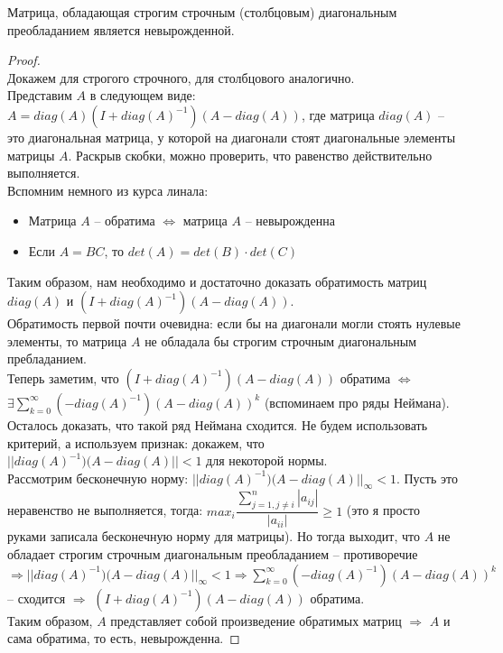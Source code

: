 \begin{theorem*}
    Матрица, обладающая строгим строчным (столбцовым) диагональным
    преобладанием является невырожденной.
\end{theorem*}
\begin{proof} \ \\
    \indent Докажем для строгого строчного, для столбцового аналогично. \\

    \indent Представим $A$ в следующем виде: $A = diag(A)(I + diag(A)^{-1})(A - diag(A))$,
    где матрица $diag(A)$ -- это диагональная матрица, у которой на диагонали
    стоят диагональные элементы матрицы $A$. Раскрыв скобки, можно проверить,
    что равенство действительно выполняется. \\

    Вспомним немного из курса линала:
    \begin{itemize}
        \item Матрица $A$ -- обратима $\Leftrightarrow$ матрица $A$ -- невырожденна
        \item Если $A = BC$, то $det(A) = det(B) \cdot det(C)$
    \end{itemize}

    Таким образом, нам необходимо и достаточно доказать обратимость матриц
    $diag(A)$ и $(I + diag(A)^{-1})(A - diag(A))$. \\
    
    Обратимость первой почти очевидна: если бы на диагонали могли стоять
    нулевые элементы, то матрица $A$ не обладала бы строгим строчным диагональным
    пребладанием. \\ 
    
    Теперь заметим, что $(I + diag(A)^{-1})(A - diag(A))$ обратима $\Leftrightarrow$
    $\exists \sum_{k = 0}^{\infty}(-diag(A)^{-1})(A - diag(A))^k$ (вспоминаем про ряды Неймана). \\ 

    Осталось доказать, что такой ряд Неймана сходится. Не будем использовать критерий,
    а используем признак: докажем, что $||diag(A)^{-1})(A - diag(A)|| < 1$ для некоторой нормы. \\
    
    Рассмотрим бесконечную норму: $||diag(A)^{-1})(A - diag(A)||_{\infty} < 1$. Пусть это неравенство не выполняется, тогда:
    $\displaystyle max_i \dfrac{\sum_{j = 1, j \neq i}^{n}|a_{ij}|}{|a_{ii}|} \geqslant 1$ (это я просто руками записала
    бесконечную норму для матрицы). Но тогда выходит, что $A$ не обладает строгим строчным
    диагональным преобладанием -- противоречие $\Rightarrow ||diag(A)^{-1})(A - diag(A)||_{\infty} < 1 \Rightarrow
    \sum_{k = 0}^{\infty}(-diag(A)^{-1})(A - diag(A))^k$ -- сходится $\Rightarrow$
    $(I + diag(A)^{-1})(A - diag(A))$ обратима. \\

    Таким образом, $A$ представляет собой произведение обратимых матриц $\Rightarrow$ $A$
    и сама обратима, то есть, невырожденна.
\end{proof}
